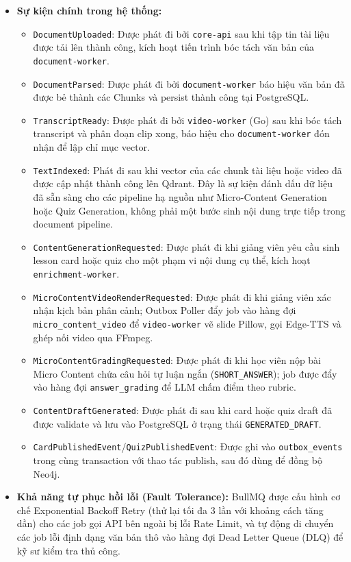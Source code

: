 \begin{itemize}
    \item \textbf{Sự kiện chính trong hệ thống:}
    \begin{itemize}
        \item \texttt{DocumentUploaded}: Được phát đi bởi \texttt{core-api}
              sau khi tập tin tài liệu được tải lên thành công, kích hoạt
              tiến trình bóc tách văn bản của \texttt{document-worker}.
        \item \texttt{DocumentParsed}: Được phát đi bởi
              \texttt{document-worker} báo hiệu văn bản đã được bẻ thành
              các Chunks và persist thành công tại PostgreSQL.
        \item \texttt{TranscriptReady}: Được phát đi bởi
              \texttt{video-worker} (Go) sau khi bóc tách transcript và
              phân đoạn clip xong, báo hiệu cho \texttt{document-worker}
              đón nhận để lập chỉ mục vector.
        \item \texttt{TextIndexed}: Phát đi sau khi vector của các chunk
              tài liệu hoặc video đã được cập nhật thành công lên Qdrant.
              Đây là sự kiện đánh dấu dữ liệu đã sẵn sàng cho các pipeline
              hạ nguồn như Micro-Content Generation hoặc Quiz Generation,
              không phải một bước sinh nội dung trực tiếp trong document
              pipeline.
        \item \texttt{ContentGenerationRequested}: Được phát đi khi giảng
              viên yêu cầu sinh lesson card hoặc quiz cho một phạm vi nội
              dung cụ thể, kích hoạt \texttt{enrichment-worker}.
        \item \texttt{MicroContentVideoRenderRequested}: Được phát đi khi giảng
              viên xác nhận kịch bản phân cảnh; Outbox Poller đẩy job vào hàng
              đợi \texttt{micro\_content\_video} để \texttt{video-worker} vẽ slide
              Pillow, gọi Edge-TTS và ghép nối video qua FFmpeg.
        \item \texttt{MicroContentGradingRequested}: Được phát đi khi học viên
              nộp bài Micro Content chứa câu hỏi tự luận ngắn (\texttt{SHORT\_ANSWER});
              job được đẩy vào hàng đợi \texttt{answer\_grading} để LLM chấm điểm
              theo rubric.
        \item \texttt{ContentDraftGenerated}: Được phát đi sau khi card hoặc
              quiz draft đã được validate và lưu vào PostgreSQL ở trạng thái
              \texttt{GENERATED\_DRAFT}.
        \item \texttt{CardPublishedEvent}/\texttt{QuizPublishedEvent}: Được
              ghi vào \texttt{outbox\_events} trong cùng transaction với
              thao tác publish, sau đó dùng để đồng bộ Neo4j.
    \end{itemize}
    \item \textbf{Khả năng tự phục hồi lỗi (Fault Tolerance):} BullMQ được
          cấu hình cơ chế Exponential Backoff Retry (thử lại tối đa 3 lần
          với khoảng cách tăng dần) cho các job gọi API bên ngoài bị lỗi
          Rate Limit, và tự động di chuyển các job lỗi định dạng văn bản
          thô vào hàng đợi Dead Letter Queue (DLQ) để kỹ sư kiểm tra thủ
          công.
\end{itemize}

